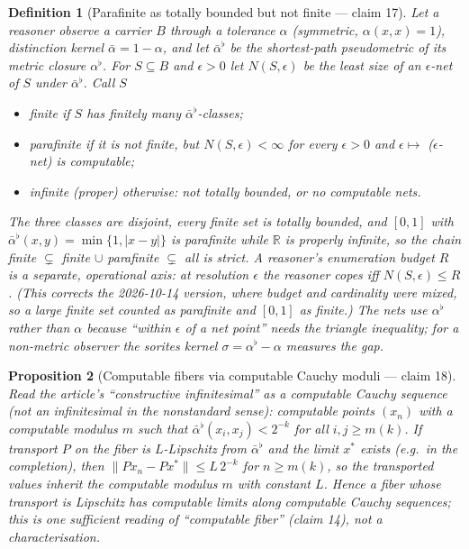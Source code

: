 \documentclass[11pt,a4paper]{article}
\newtheorem{definition}{Definition}[section]
\newtheorem{proposition}[definition]{Proposition}
\begin{document}
\begin{definition}[Parafinite as totally bounded but not finite --- claim 17]
\label{def:covering}
Let a reasoner observe a carrier $B$ through a tolerance $\alpha$ (symmetric,
$\alpha(x,x)=1$), distinction kernel $\bar\alpha=1-\alpha$, and let
$\bar\alpha^{\flat}$ be the shortest-path pseudometric of its metric closure
$\alpha^{\flat}$. For $S\subseteq B$ and $\epsilon>0$ let $N(S,\epsilon)$ be
the least size of an $\epsilon$-net of $S$ under $\bar\alpha^{\flat}$. Call $S$
\begin{itemize}
\item \emph{finite} if $S$ has finitely many $\bar\alpha^{\flat}$-classes;
\item \emph{parafinite} if it is not finite, but $N(S,\epsilon)<\infty$ for
  every $\epsilon>0$ and $\epsilon\mapsto$ ($\epsilon$-net) is computable;
\item \emph{infinite} (proper) otherwise: not totally bounded, or no computable nets.
\end{itemize}
The three classes are disjoint, every finite set is totally bounded, and
$[0,1]$ with $\bar\alpha^{\flat}(x,y)=\min\{1,|x-y|\}$ is parafinite while
$\mathbb{R}$ is properly infinite, so the chain finite $\subsetneq$ finite
$\cup$ parafinite $\subsetneq$ all is strict. A reasoner's enumeration budget
$R$ is a separate, operational axis: at resolution $\epsilon$ the reasoner
copes iff $N(S,\epsilon)\le R$. (This corrects the 2026-10-14 version, where
budget and cardinality were mixed, so a large finite set counted as
parafinite and $[0,1]$ as finite.) The nets use $\alpha^{\flat}$ rather than
$\alpha$ because ``within $\epsilon$ of a net point'' needs the triangle
inequality; for a non-metric observer the sorites kernel
$\sigma=\alpha^{\flat}-\alpha$ measures the gap.
\end{definition}

\begin{proposition}[Computable fibers via computable Cauchy moduli --- claim 18]
\label{prop:dincrement}
Read the article's ``constructive infinitesimal'' as a computable Cauchy
sequence (not an infinitesimal in the nonstandard sense): computable points
$(x_n)$ with a computable modulus $m$ such that
$\bar\alpha^{\flat}(x_i,x_j)<2^{-k}$ for all $i,j\ge m(k)$. If transport $P$ on
the fiber is $L$-Lipschitz from $\bar\alpha^{\flat}$ and the limit $x^*$
exists (e.g.\ in the completion), then
$\|P x_n-P x^*\|\le L\,2^{-k}$ for $n\ge m(k)$, so the transported values
inherit the computable modulus $m$ with constant $L$. Hence a fiber whose
transport is Lipschitz has computable limits along computable Cauchy
sequences; this is one sufficient reading of ``computable fiber'' (claim 14),
not a characterisation.
\end{proposition}
\end{document}
